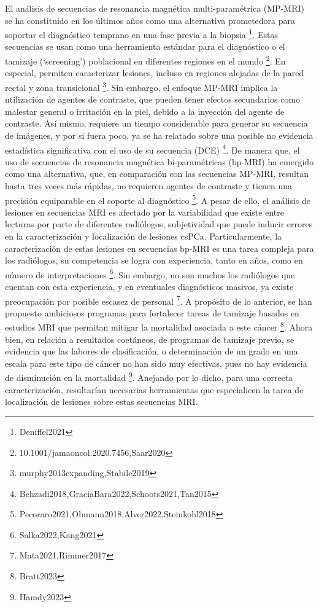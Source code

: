 El análisis de secuencias de resonancia magnética multi-paramétrica (MP-MRI) se ha constituido en los últimos años como una alternativa prometedora para soportar el diagnóstico temprano en una fase previa a la biopsia \footnote{Deniffel2021}. Estas secuencias se usan como una herramienta estándar para el diagnóstico o el tamizaje (`screening') poblacional en diferentes regiones en el mundo \footnote{10.1001/jamaoncol.2020.7456,Saar2020}. En especial, permiten caracterizar lesiones, incluso en regiones alejadas de la pared rectal y zona transicional \footnote{murphy2013expanding,Stabile2019}. Sin embargo, el enfoque MP-MRI implica la utilización de agentes de contraste, que pueden tener efectos secundarios como malestar general o irritación en la piel, debido a la inyección del agente de contraste. Así mismo, requiere un tiempo considerable para generar su secuencia de imágenes, y por si fuera poco, ya se ha relatado sobre una posible no evidencia estadística significativa con el uso de su secuencia (DCE) \footnote{Behzadi2018,GraciaBara2022,Schoots2021,Tan2015}. De manera que, el uso de secuencias de resonancia magnética bi-paramétricas (bp-MRI) ha emergido como una alternativa, que,  en comparación con las secuencias MP-MRI, resultan hasta tres veces más rápidas, no requieren agentes de contraste y tienen una precisión equiparable en el soporte al diagnóstico \footnote{Pecoraro2021,Obmann2018,Alver2022,Steinkohl2018}.
A pesar de ello, el análisis de lesiones en secuencias MRI es afectado por la variabilidad que existe entre lecturas por parte de diferentes radiólogos, subjetividad que puede inducir errores en la caracterización y localización de lesiones csPCa. Particularmente, la caracterización de estas lesiones en secuencias bp-MRI es una tarea compleja para los radiólogos, su competencia se logra con experiencia, tanto en años, como en número de interpretaciones \footnote{Salka2022,Kang2021}. Sin embargo, 
no son muchos los radiólogos que cuentan con esta experiencia, y en eventuales diagnósticos masivos, ya existe preocupación por posible escasez de personal \footnote{Mata2021,Rimmer2017}. A propósito de lo anterior, se han propuesto ambiciosos programas para fortalecer tareas de tamizaje basados en estudios MRI que permitan mitigar la mortalidad asociada a este cáncer \footnote{Bratt2023}. Ahora bien, en relación a resultados coetáneos, de programas de tamizaje previo, se evidencia que las labores de clasificación, o determinación de un grado en una escala para este tipo de cáncer no han sido muy efectivas, pues no hay evidencia de disminución en la mortalidad \footnote{Hamdy2023}. Anejando por lo dicho, para una correcta caracterización, resultarían necesarias herramientas que especialicen la tarea de localización de lesiones sobre estas secuencias MRI.\par

